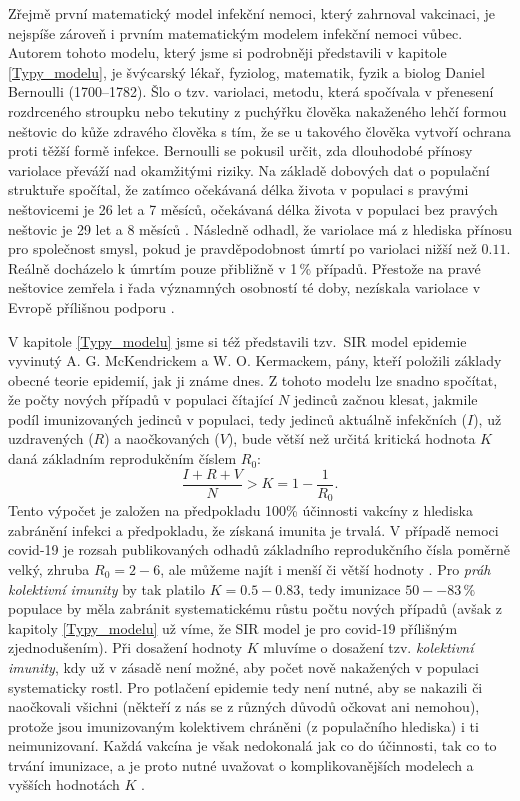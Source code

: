 Zřejmě první matematický model infekční nemoci, který zahrnoval vakcinaci, je nejspíše zároveň i prvním matematickým modelem infekční nemoci vůbec. Autorem tohoto modelu, který jsme si podrobněji představili v kapitole \ref{Typy_modelu}, je švýcarský lékař, fyziolog, matematik, fyzik a biolog Daniel Bernoulli (1700--1782). Šlo o tzv. variolaci, metodu, která spočívala v přenesení rozdrceného stroupku nebo tekutiny z puchýřku člověka nakaženého lehčí formou neštovic do kůže zdravého člověka s tím, že se u takového člověka vytvoří ochrana proti těžší formě infekce. Bernoulli se pokusil určit, zda dlouhodobé přínosy variolace převáží nad okamžitými riziky. Na základě dobových dat o populační struktuře spočítal, že zatímco očekávaná délka života v populaci s pravými neštovicemi je 26 let a 7 měsíců, očekávaná délka života v populaci bez pravých neštovic je 29 let a 8 měsíců \cite{Bacaer2011}. Následně odhadl, že variolace má z hlediska přínosu pro společnost smysl, pokud je pravděpodobnost úmrtí po variolaci nižší než $0.11$. Reálně docházelo k úmrtím pouze přibližně v 1\,\% případů. Přestože na pravé neštovice zemřela i řada významných osobností té doby, nezískala variolace v Evropě přílišnou podporu \cite{Bacaer2011}.

V kapitole \ref{Typy_modelu} jsme si též představili tzv.\ SIR model epidemie vyvinutý A. G. McKendrickem a W. O. Kermackem, pány, kteří položili základy obecné teorie epidemií, jak ji známe dnes. Z tohoto modelu lze snadno spočítat, že počty nových případů v populaci čítající $N$ jedinců začnou klesat, jakmile podíl imunizovaných jedinců v populaci, tedy jedinců aktuálně infekčních ($I$), už uzdravených ($R$) a naočkovaných ($V$), bude větší než určitá kritická hodnota $K$ daná základním reprodukčním číslem $R_0$:
\begin{equation}
\frac{I+R+V}{N} > K = 1-\frac{1}{R_0}.
\end{equation}
Tento výpočet je založen na předpokladu 100\% účinnosti vakcíny z hlediska zabránění infekci a předpokladu, že získaná imunita je trvalá. V případě nemoci covid-19 je rozsah publikovaných odhadů základního reprodukčního čísla poměrně velký, zhruba $R_0 = 2-6$, ale můžeme najít i menší či větší hodnoty \cite[a uvnitř citované reference]{Billah_etal2020,Locatelli_etal2021}. Pro \emph{práh kolektivní imunity} by tak platilo $K = 0.5-0.83$, tedy imunizace $50--83\,\%$ populace by měla zabránit systematickému růstu počtu nových případů (avšak z kapitoly \ref{Typy_modelu} už víme, že SIR model je pro covid-19 přílišným zjednodušením). Při dosažení hodnoty $K$ mluvíme o dosažení tzv. \emph{kolektivní imunity}, kdy už v zásadě není možné, aby počet nově nakažených v populaci systematicky rostl. Pro potlačení epidemie tedy není nutné, aby se nakazili či naočkovali všichni (někteří z nás se z různých důvodů očkovat ani nemohou), protože jsou imunizovaným kolektivem chráněni (z populačního hlediska) i ti neimunizovaní. Každá vakcína je však nedokonalá jak co do účinnosti, tak co to trvání imunizace, a je proto nutné uvažovat o komplikovanějších modelech a vyšších hodnotách $K$ \cite{K1,K2}.

